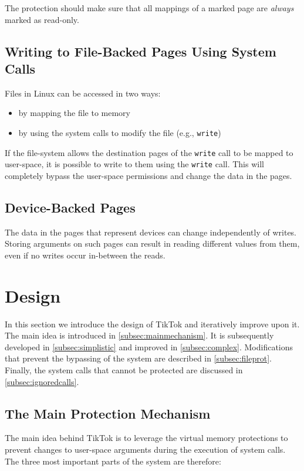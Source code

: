 \documentclass[conference]{IEEEtran}
\newcommand{\sysname}{TikTok}
\begin{document}
The protection should make sure that all mappings of a marked page are \emph{always}
marked as read-only.

\subsection{Writing to File-Backed Pages Using System Calls}

Files in Linux can be accessed in two ways:
\begin{itemize}
    \item by mapping the file to memory
    \item by using the system calls to modify the file (e.g., \texttt{write})
\end{itemize}

If the file-system allows the destination pages of the \texttt{write} call to be
mapped to user-space, it is possible to write to them using the \texttt{write}
call. This will completely bypass the user-space permissions and change the data
in the pages.

\subsection{Device-Backed Pages}

The data in the pages that represent devices can change independently of writes.
Storing arguments on such pages can result in reading different values from them,
even if no writes occur in-between the reads.

\section{Design}
\label{sec:design}

In this section we introduce the design of \sysname{} and iteratively improve upon
it. The main idea is introduced in \autoref{subsec:mainmechanism}. It is
subsequently developed in \autoref{subsec:simplistic} and improved in \autoref{subsec:complex}.
Modifications that prevent the bypassing of the system are described in \autoref{subsec:fileprot}.
Finally, the system calls that cannot be protected are discussed in \autoref{subsec:ignoredcalls}.

\subsection{The Main Protection Mechanism}
\label{subsec:mainmechanism}

The main idea behind \sysname{} is to leverage the virtual memory protections to
prevent changes to user-space arguments during the execution of system calls.
The three most important parts of the system are therefore:
\end{document}
